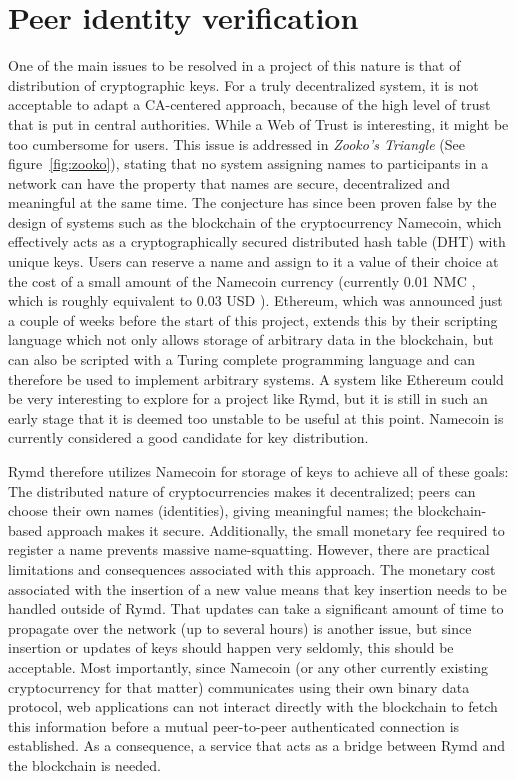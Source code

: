 \section{Peer identity verification}
\label{sec:authorization}
One of the main issues to be resolved in a project of this nature is that of distribution of cryptographic keys. For a truly decentralized system, it is not acceptable to adapt a CA-centered approach, because of the high level of trust that is put in central authorities. While a Web of Trust is interesting, it might be too cumbersome for users. This issue is addressed in \emph{Zooko's Triangle} (See figure~\ref{fig:zooko}), stating that no system assigning names to participants in a network can have the property that names are secure, decentralized and meaningful at the same time\cite{Zooko:2001:Online}. The conjecture has since been proven false by the design of systems such as the blockchain of the cryptocurrency Namecoin, which effectively acts as a cryptographically secured distributed hash table (DHT) with unique keys. Users can reserve a name and assign to it a value of their choice at the cost of a small amount of the Namecoin currency (currently 0.01 NMC \cite{Namecoin:2014:Online}, which is roughly equivalent to 0.03 USD \cite{CryptoCoinCharts:2014:Online}). Ethereum, which was announced just a couple of weeks before the start of this project, extends this by their scripting language which not only allows storage of arbitrary data in the blockchain, but can also be scripted with a Turing complete programming language and can therefore be used to implement arbitrary systems. A system like Ethereum could be very interesting to explore for a project like Rymd, but it is still in such an early stage that it is deemed too unstable to be useful at this point. Namecoin is currently considered a good candidate for key distribution.

Rymd therefore utilizes Namecoin for storage of keys to achieve all of these goals: The distributed nature of cryptocurrencies makes it decentralized; peers can choose their own names (identities), giving meaningful names; the blockchain-based approach makes it secure. Additionally, the small monetary fee required to register a name prevents massive name-squatting. However, there are practical limitations and consequences associated with this approach. The monetary cost associated with the insertion of a new value means that key insertion needs to be handled outside of Rymd. That updates can take a significant amount of time to propagate over the network (up to several hours) is another issue, but since insertion or updates of keys should happen very seldomly, this should be acceptable. Most importantly, since Namecoin (or any other currently existing cryptocurrency for that matter) communicates using their own binary data protocol\cite{BitcoinSource:2014:Online}, web applications can not interact directly with the blockchain to fetch this information before a mutual peer-to-peer authenticated connection is established. As a consequence, a service that acts as a bridge between Rymd and the blockchain is needed.


